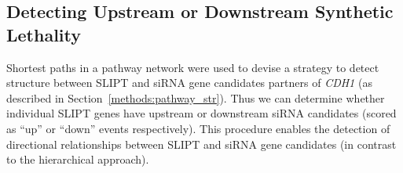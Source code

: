 
\FloatBarrier

\subsection{Detecting Upstream or Downstream Synthetic Lethality}  \label{chapt4:Structure_GPCR}

Shortest paths in a \gls{pathway} network were used to devise a strategy to detect  structure between \gls{SLIPT} and \gls{siRNA} gene candidates partners of \textit{CDH1} (as described in Section~\ref{methods:pathway_str}). Thus we can determine whether individual \gls{SLIPT} genes have upstream or downstream \gls{siRNA} candidates (scored as ``up'' or ``down'' events respectively). This procedure enables the detection of directional relationships between \gls{SLIPT} and \gls{siRNA} gene candidates (in contrast to the hierarchical approach).


